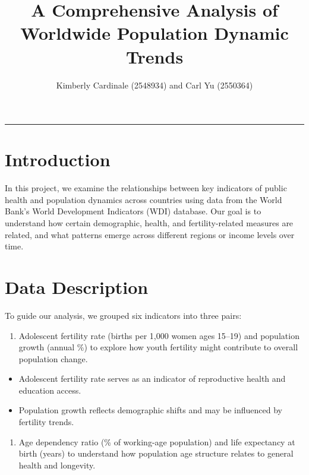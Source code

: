 \documentclass[
  letterpaper,
  DIV=11,
  numbers=noendperiod]{scrartcl}
\title{A Comprehensive Analysis of Worldwide Population Dynamic Trends}
\author{Kimberly Cardinale (2548934) and Carl Yu (2550364)}
\date{}
\providecommand{\tightlist}{%
  \setlength{\itemsep}{0pt}\setlength{\parskip}{0pt}}
\begin{document}
\maketitle


\begin{center}\rule{0.5\linewidth}{0.5pt}\end{center}

\section{Introduction}\label{introduction}

In this project, we examine the relationships between key indicators of
public health and population dynamics across countries using data from
the World Bank's World Development Indicators (WDI) database. Our goal
is to understand how certain demographic, health, and fertility-related
measures are related, and what patterns emerge across different regions
or income levels over time.

\section{Data Description}\label{data-description}

To guide our analysis, we grouped six indicators into three pairs:

\begin{enumerate}
\def\labelenumi{\arabic{enumi}.}
\tightlist
\item
  Adolescent fertility rate (births per 1,000 women ages 15--19) and
  population growth (annual \%) to explore how youth fertility might
  contribute to overall population change.
\end{enumerate}

\begin{itemize}
\tightlist
\item
  Adolescent fertility rate serves as an indicator of reproductive
  health and education access.
\item
  Population growth reflects demographic shifts and may be influenced by
  fertility trends.
\end{itemize}

\begin{enumerate}
\def\labelenumi{\arabic{enumi}.}
\setcounter{enumi}{1}
\tightlist
\item
  Age dependency ratio (\% of working-age population) and life
  expectancy at birth (years) to understand how population age structure
  relates to general health and longevity.
\end{enumerate}
\end{document}
